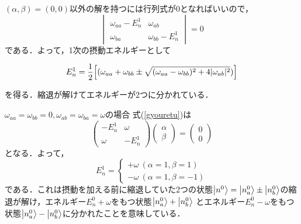 \documentclass{standalone}
\begin{document}
  $(\alpha,\beta)=(0,0)$以外の解を持つには行列式が0となればいいので，
  \begin{equation}
    \begin{vmatrix}
      \omega_{aa}-E_n^1&\omega_{ab}\\
      \omega_{ba}&\omega_{bb}-E_n^1
    \end{vmatrix}
    =0
  \end{equation}
  である．よって，1次の摂動エネルギーとして
  \begin{screen}
  \begin{equation}
    \label{syukutai}
    E_n^1=\frac{1}{2}\qty[(\omega_{aa}+\omega_{bb}\pm\sqrt{(\omega_{aa}-\omega_{bb})^2+4|\omega_{ab}|^2})]
  \end{equation}
  \end{screen}
  を得る．縮退が解けてエネルギーが2つに分かれている．
  \begin{myex}{}{}$\omega_{aa}=\omega_{bb}=0,\omega_{ab}=\omega_{ba}=\omega$の場合
  式(\ref{gyouretu})は
  \begin{equation}
    \begin{pmatrix}
      -E_n^1&\omega\\
      \omega&-E_n^1
    \end{pmatrix}
    \begin{pmatrix}
      \alpha\\
      \beta
    \end{pmatrix}
    =\begin{pmatrix}
      0\\0
    \end{pmatrix}
  \end{equation}
  となる．よって，
  \begin{equation}
    E_n^1=
    \begin{cases}
      +\omega\ (\alpha=1,\beta=1)\\
      -\omega\ (\alpha=1,\beta=-1)
    \end{cases}
  \end{equation}
  である．これは摂動を加える前に縮退していた2つの状態$\ket{n^0}=\ket{n_a^0}\pm\ket{n_b^0}$の縮退が解け，エネルギー$E_n^0+\omega$をもつ状態$\ket{n_a^0}+\ket{n_b^0}$
  とエネルギー$E_n^0-\omega$をもつ状態$\ket{n_a^0}-\ket{n_b^0}$に分かれたことを意味している．
  \end{myex}
\end{document}
